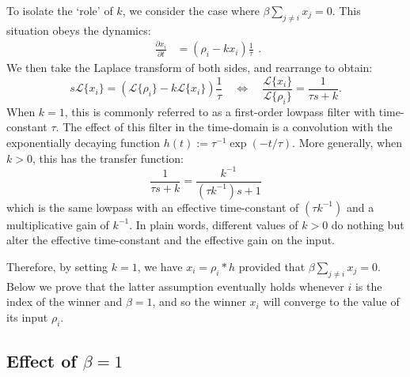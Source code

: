 \documentclass[a4paper]{article}
\begin{document}
To isolate the `role' of $k$, we consider the case where $\beta \sum_{j \ne i} x_j = 0$. 
This situation obeys the dynamics:
\begin{equation}
    \begin{split}
        \frac{{\partial x}_i}{\partial t} &= \left(\rho_i - kx_i\right) 
        \frac{1}{\tau}
    \end{split}.
\end{equation}
We then take the Laplace transform of both sides, and rearrange to obtain:
\begin{equation}
s\mathcal{L}\{x_i\} = \left( \mathcal{L}\{\rho_i\} - k\mathcal{L}\{x_i\} \right) \frac{1}{\tau} \quad \iff \quad \frac{\mathcal{L}\{x_i\}}{\mathcal{L}\{\rho_i\}} = \frac{1}{\tau s + k}.
\end{equation}
When $k = 1$, this is commonly referred to as a first-order lowpass filter with time-constant $\tau$.
The effect of this filter in the time-domain is a convolution with the exponentially decaying function $h(t) := \tau^{-1} \exp\left( -t / \tau \right)$.
More generally, when $k > 0$, this has the transfer function:
\begin{equation}
\frac{1}{\tau s + k} = \frac{k^{-1}}{(\tau k^{-1})s + 1}
\end{equation}
which is the same lowpass with an effective time-constant of $(\tau k^{-1})$ and a multiplicative gain of $k^{-1}$.
In plain words, different values of $k > 0$ do nothing but alter the effective time-constant and the effective gain on the input.

Therefore, by setting $k = 1$, we have $x_i = \rho_i \ast h$ provided that $\beta \sum_{j \ne i} x_j = 0$.
Below we prove that the latter assumption eventually holds whenever $i$ is the index of the winner and $\beta = 1$, and so the winner $x_i$ will converge to the value of its input $\rho_i$.

\newpage

\subsection{Effect of $\beta = 1$}
\end{document}
